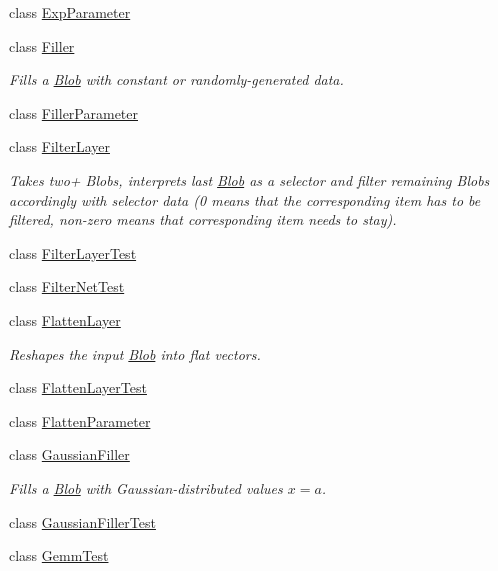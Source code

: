 \begin{DoxyCompactItemize}
class \mbox{\hyperlink{classcaffe_1_1_exp_parameter}{Exp\+Parameter}}
\item 
class \mbox{\hyperlink{classcaffe_1_1_filler}{Filler}}
\begin{DoxyCompactList}\small\item\em Fills a \mbox{\hyperlink{classcaffe_1_1_blob}{Blob}} with constant or randomly-\/generated data. \end{DoxyCompactList}\item 
class \mbox{\hyperlink{classcaffe_1_1_filler_parameter}{Filler\+Parameter}}
\item 
class \mbox{\hyperlink{classcaffe_1_1_filter_layer}{Filter\+Layer}}
\begin{DoxyCompactList}\small\item\em Takes two+ Blobs, interprets last \mbox{\hyperlink{classcaffe_1_1_blob}{Blob}} as a selector and filter remaining Blobs accordingly with selector data (0 means that the corresponding item has to be filtered, non-\/zero means that corresponding item needs to stay). \end{DoxyCompactList}\item 
class \mbox{\hyperlink{classcaffe_1_1_filter_layer_test}{Filter\+Layer\+Test}}
\item 
class \mbox{\hyperlink{classcaffe_1_1_filter_net_test}{Filter\+Net\+Test}}
\item 
class \mbox{\hyperlink{classcaffe_1_1_flatten_layer}{Flatten\+Layer}}
\begin{DoxyCompactList}\small\item\em Reshapes the input \mbox{\hyperlink{classcaffe_1_1_blob}{Blob}} into flat vectors. \end{DoxyCompactList}\item 
class \mbox{\hyperlink{classcaffe_1_1_flatten_layer_test}{Flatten\+Layer\+Test}}
\item 
class \mbox{\hyperlink{classcaffe_1_1_flatten_parameter}{Flatten\+Parameter}}
\item 
class \mbox{\hyperlink{classcaffe_1_1_gaussian_filler}{Gaussian\+Filler}}
\begin{DoxyCompactList}\small\item\em Fills a \mbox{\hyperlink{classcaffe_1_1_blob}{Blob}} with Gaussian-\/distributed values $ x = a $. \end{DoxyCompactList}\item 
class \mbox{\hyperlink{classcaffe_1_1_gaussian_filler_test}{Gaussian\+Filler\+Test}}
\item 
class \mbox{\hyperlink{classcaffe_1_1_gemm_test}{Gemm\+Test}}

\end{DoxyCompactItemize}
